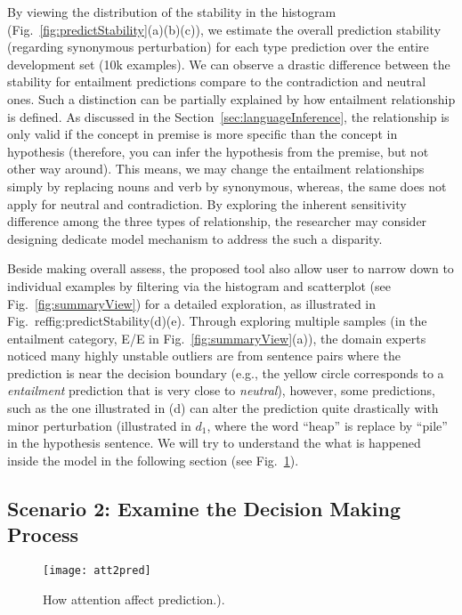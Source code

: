 By viewing the distribution of the stability in the histogram (Fig.~\ref{fig:predictStability}(a)(b)(c)), we estimate the overall prediction stability (regarding synonymous perturbation) for each type prediction over the entire development set (10k examples).
%
We can observe a drastic difference between the stability for entailment predictions compare to the contradiction and neutral ones.
%
Such a distinction can be partially explained by how entailment relationship is defined. As discussed in the Section~\ref{sec:languageInference}, the relationship is only valid if the concept in premise is more specific than the concept in hypothesis (therefore, you can infer the hypothesis from the premise, but not other way around). This means, we may change the entailment relationships simply by replacing nouns and verb by synonymous, whereas, the same does not apply for neutral and contradiction.
%
By exploring the inherent sensitivity difference among the three types of relationship, the researcher may consider designing dedicate model mechanism to address the such a disparity.

Beside making overall assess, the proposed tool also allow user to narrow down to individual examples by filtering via the histogram and scatterplot (see Fig.~\ref{fig:summaryView}) for a detailed exploration, as illustrated in Fig.~ref{fig:predictStability}(d)(e). 
%
Through exploring multiple samples (in the entailment category, E/E in Fig.~\ref{fig:summaryView}(a)), the domain experts noticed many highly unstable outliers are from sentence pairs where the prediction is near the decision boundary (e.g., the yellow circle corresponds to a \emph{entailment} prediction that is very close to \emph{neutral}), however, some predictions, such as the one illustrated in (d) can alter the prediction quite drastically with minor perturbation (illustrated in $d_1$, where the word ``heap'' is replace by ``pile'' in the hypothesis sentence. We will try to understand the what is happened inside the model in the following section (see Fig.~\ref{fig:att2pred}).

\subsection{Scenario 2: Examine the Decision Making Process}

\begin{figure}[htbp]
\centering
\vspace{-2mm}
 \texttt{[image: att2pred]}
 \caption{
How attention affect prediction.).
%
}
\label{fig:att2pred}
\end{figure}

